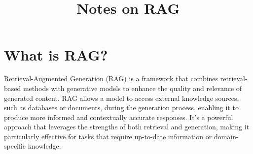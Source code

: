 \documentclass[conference]{IEEEtran}
\title{Notes on RAG }
\author{
\IEEEauthorblockN{Luis Mendez}
}
\begin{document}
\maketitle

\section{What is RAG?}
Retrieval-Augmented Generation (RAG) is a framework that combines retrieval-based methods with generative models to enhance the quality and relevance of generated content. RAG allows a model to access external knowledge sources, such as databases or documents, during the generation process, enabling it to produce more informed and contextually accurate responses.
It's a powerful approach that leverages the strengths of both retrieval and generation, making it particularly effective for tasks that require up-to-date information or domain-specific knowledge.
\end{document}

